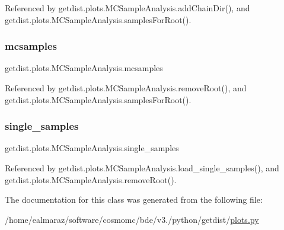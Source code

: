Referenced by getdist.\+plots.\+M\+C\+Sample\+Analysis.\+add\+Chain\+Dir(), and getdist.\+plots.\+M\+C\+Sample\+Analysis.\+samples\+For\+Root().

\mbox{\label{classgetdist_1_1plots_1_1MCSampleAnalysis_a5790d00b57a55b123b63fe42c5a65006}} 
\subsubsection{\texorpdfstring{mcsamples}{mcsamples}}
{\footnotesize\ttfamily getdist.\+plots.\+M\+C\+Sample\+Analysis.\+mcsamples}



Referenced by getdist.\+plots.\+M\+C\+Sample\+Analysis.\+remove\+Root(), and getdist.\+plots.\+M\+C\+Sample\+Analysis.\+samples\+For\+Root().

\mbox{\label{classgetdist_1_1plots_1_1MCSampleAnalysis_a870b19f6395bcb2ab86cbbb606bc223d}} 
\subsubsection{\texorpdfstring{single\+\_\+samples}{single\_samples}}
{\footnotesize\ttfamily getdist.\+plots.\+M\+C\+Sample\+Analysis.\+single\+\_\+samples}



Referenced by getdist.\+plots.\+M\+C\+Sample\+Analysis.\+load\+\_\+single\+\_\+samples(), and getdist.\+plots.\+M\+C\+Sample\+Analysis.\+remove\+Root().



The documentation for this class was generated from the following file\+:\begin{DoxyCompactItemize}
\item 
/home/ealmaraz/software/cosmomc/bde/v3./python/getdist/\mbox{\hyperlink{plots_8py}{plots.\+py}}\end{DoxyCompactItemize}
